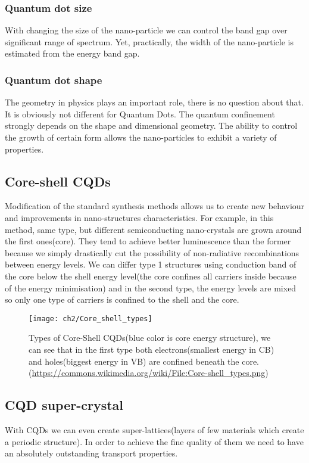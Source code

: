 \subsubsection{Quantum dot size}
With changing the size of the nano-particle we can control the band gap over significant range of spectrum. Yet, practically, the width of the nano-particle is estimated from the energy band gap.
 \cite{Yu2003}
 
\subsubsection{Quantum dot shape}
The geometry in physics plays an important role, there is no question about that. It is obviously not different for Quantum Dots. The quantum confinement strongly depends on the shape and dimensional geometry. The ability to control the growth of certain form allows the nano-particles to exhibit a variety of properties. 

\subsection{Core-shell CQDs}     
Modification of the standard synthesis methods allows us to create new behaviour and improvements in nano-structures characteristics. For example, in this method, same type, but different semiconducting nano-crystals are grown around the first ones(core). They tend to achieve better luminescence than the former because we simply drastically cut the possibility of non-radiative recombinations between energy levels. We can differ type 1 structures using conduction band of the core below the shell energy level(the core confines all carriers inside because of the energy minimisation) and in the second type, the energy levels are mixed so only one type of carriers is confined to the shell and the core. \cite{phdsemi}

\begin{figure}[h]
\centering
\texttt{[image: ch2/Core\_shell\_types]}
\caption{Types of Core-Shell CQDs(blue color is core energy structure), we can see that in the first type both electrons(smallest energy in CB) and holes(biggest energy in VB) are confined beneath the core. (\url{https://commons.wikimedia.org/wiki/File:Core-shell_types.png})}
\end{figure}

\subsection{CQD super-crystal}
With CQDs we can even create super-lattices(layers of few materials which create a periodic structure). In order to achieve the fine quality of them we need to have an absolutely outstanding transport properties. \cite{tranSupLat}
